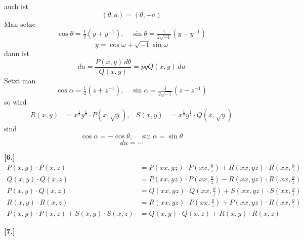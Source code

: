 \documentclass[10pt,a4paper]{article}
\begin{document}
auch ist
%
\begin{equation*}
(\theta, a) = (\theta, -a)
\end{equation*}
%
Man setze
%
\begin{equation*}
\cos\theta = \tfrac{1}{2}(y + y^{-1}), \quad \sin\theta = \tfrac{1}{2\sqrt{-1}}(y - y^{-1})
\end{equation*}
%
\begin{equation*}
y = \cos\omega + \sqrt{-1}\sin\omega
\end{equation*}
%
dann ist
%
\begin{equation*}
du = \frac{P(x, y)\, d\theta}{Q(x, y)} = pqQ(x, y)\, du
\end{equation*}
%
Setzt man
%
\begin{equation*}
\cos\alpha = \tfrac{1}{2}(z + z^{-1}), \quad \sin\alpha = \tfrac{1}{2\sqrt{-1}}(z - z^{-1})
\end{equation*}
%
so wird
%
\begin{align*}
R(x, y) &= x^{\frac{1}{2}}y^{\frac{1}{2}} \cdot P(x, \sqrt{y}), & S(x, y) &= x^{\frac{1}{2}}y^{\frac{1}{2}} \cdot Q(x, \sqrt{y})
\end{align*}
%
sind
%
\begin{equation*}
\cos\alpha = -\cos\theta, \quad \sin\alpha = \sin\theta
\end{equation*}
%
\begin{equation*}
du = \cdots
\end{equation*}

\textbf{[6.]}
%
\begin{align*}
P(x, y) \cdot P(x, z) &= P(xx, yz) \cdot P(xx, \tfrac{y}{z}) + R(xx, yz) \cdot R(xx, \tfrac{y}{z}) \\
Q(x, y) \cdot Q(x, z) &= P(xx, yz) \cdot P(xx, \tfrac{y}{z}) - R(xx, yz) \cdot R(xx, \tfrac{y}{z}) \\
P(x, y) \cdot Q(x, z) &= Q(xx, yz) \cdot Q(xx, \tfrac{y}{z}) + S(xx, yz) \cdot S(xx, \tfrac{y}{z}) \\
R(x, y) \cdot R(x, z) &= R(xx, yz) \cdot P(xx, \tfrac{y}{z}) + P(xx, yz) \cdot R(xx, \tfrac{y}{z}) \\
P(x, y) \cdot P(x, z) + S(x, y) \cdot S(x, z) &= Q(x, y) \cdot Q(x, z) + R(x, y) \cdot R(x, z)
\end{align*}

\newpage
\textbf{[7.]}
\end{document}
